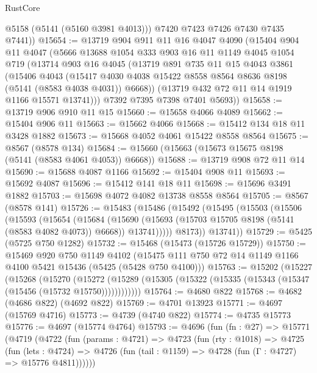 \begin{lexlean}{RustCore}
\begin{coremodule}
          @5158
          (@5141 (@5160 @3981 @4013)))
        @7420
        @7423
        @7426
        @7430
        @7435
        @7441))
@15654 := @13719
    @904
    @911
    @11
    @16
    @4047
    @4090
    (@15404
      @904
      @11
      @4047
      (@5666
        @13688
        @1054
        @333
        @903
        @16
        @11
        @1149
        @4045
        @1054
        @719
        (@13714
          @903
          @16
          @4045
          (@13719
            @891
            @735
            @11
            @15
            @4043
            @3861
            (@15406
              @4043
              (@15417 @4030 @4038 @15422 @8558 @8564 @8636 @8198 (@5141 (@8583 @4038 @4031)) @6668))
            (@13719 @432 @72 @11 @14 @1919 @1166 @15571 @13741)))
        @7392
        @7395
        @7398
        @7401
        @5693))
@15658 := @13719 @906 @910 @11 @15
@15660 := @15658 @4066 @4089
@15662 := @15404 @906 @11
@15663 := @15662 @4066
@15668 := @15412 @134 @18 @11 @3428 @1882
@15673 := @15668 @4052 @4061 @15422 @8558 @8564
@15675 := @8567 (@8578 @134)
@15684 := @15660 (@15663 (@15673 @15675 @8198 (@5141 (@8583 @4061 @4053)) @6668))
@15688 := @13719 @908 @72 @11 @14
@15690 := @15688 @4087 @1166
@15692 := @15404 @908 @11
@15693 := @15692 @4087
@15696 := @15412 @141 @18 @11
@15698 := @15696 @3491 @1882
@15703 := @15698 @4072 @4082 @13738 @8558 @8564
@15705 := @8567 (@8578 @141)
@15726 := @15483
    (@15486
      (@15492
        (@15495
          (@15503
            (@15506
              (@15593
                (@15654
                  (@15684
                    (@15690
                      (@15693 (@15703 @15705 @8198 (@5141 (@8583 @4082 @4073)) @6668))
                      @13741)))))
            @8173))
        @13741))
@15729 := @5425 (@5725 @750 @1282)
@15732 := @15468 (@15473 (@15726 @15729))
@15750 := @15469
    @920
    @750
    @1149
    @4102
    (@15475 @111 @750 @72 @14 @1149 @1166 @4100 @5421 @15436 (@5425 (@5428 @750 @4100)))
@15763 := @15202
    (@15227
      (@15268
        (@15270
          (@15272 (@15289 (@15305 (@15322 (@15335 (@15343 (@15347 (@15456 (@15732 @15750))))))))))))
@15764 := @4680 @822
@15768 := @4682 (@4686 @822) (@4692 @822)
@15769 := @4701 @13923
@15771 := @4697 (@15769 @4716)
@15773 := @4739 (@4740 @822)
@15774 := @4735 @15773
@15776 := @4697 (@15774 @4764)
@15793 := @4696
    (fun (fn : @27) =>
    @15771
      (@4719
        (@4722
          (fun (params : @4721) =>
          @4723
            (fun (rty : @1018) =>
            @4725
              (fun (lets : @4724) =>
              @4726 (fun (tail : @1159) => @4728 (fun (Γ : @4727) => @15776 @4811))))))

\end{coremodule}
\end{lexlean}
